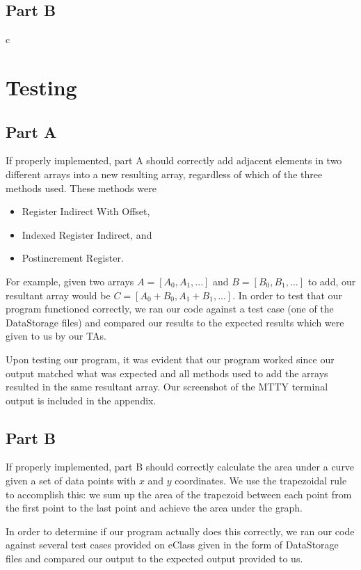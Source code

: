 \documentclass[10pt, letterpaper, titlepage]{article} %
\begin{document}
\begin{multicols*}{2}
\subsection{Part B}
c

\section{Testing}
\subsection{Part A}
If properly implemented, part A should correctly add adjacent elements in two different arrays into a new resulting array, regardless of which of the three methods used. 
These methods were
\begin{itemize}
	\item Register Indirect With Offset,
	\item Indexed Register Indirect, and
	\item Postincrement Register.
\end{itemize}
For example, given two arrays $A = [A_0, A_1, ...]$ and $B = [B_0, B_1, ...]$ to add, our resultant array would be $C = [A_0 + B_0, A_1 + B_1, ...]$.
In order to test that our program functioned correctly, we ran our code against a test case (one of the DataStorage files) and compared our results to the expected results which were given to us by our TAs. 

Upon testing our program, it was evident that our program worked since our output matched what was expected and all methods used to add the arrays resulted in the same resultant array. Our screenshot of the MTTY terminal output is included in the appendix.

\subsection{Part B}
If properly implemented, part B should correctly calculate the area under a curve given a set of data points with $x$ and $y$ coordinates. We use the trapezoidal rule to accomplish this: we sum up the area of the trapezoid between each point from the first point to the last point and achieve the area under the graph. 

In order to determine if our program actually does this correctly, we ran our code against several test cases provided on eClass given in the form of DataStorage files and compared our output to the expected output provided to us. 


\end{multicols*}
\end{document}
